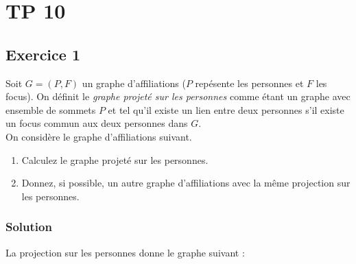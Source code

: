 \section{TP 10}


\subsection*{Exercice 1}
Soit $G = (P, F)$ un graphe d'affiliations ($P$ rep\'{e}sente les personnes et $F$ les focus). On d\'{e}finit le \emph{graphe projet\'{e} sur les personnes} comme \'{e}tant un graphe avec ensemble de sommets $P$ et tel qu'il existe un lien entre deux personnes s'il existe un focus commun aux deux personnes dans $G$. \\

On consid\`{e}re le graphe d'affiliations suivant.
\begin{center}
\end{center}

\begin{enumerate}
\item Calculez le graphe projet\'{e} sur les personnes.

\item Donnez, si possible, un autre graphe d'affiliations avec la m\^{e}me projection sur les personnes.
\end{enumerate}

    \subsubsection*{Solution}
    La projection sur les personnes donne le graphe suivant :

